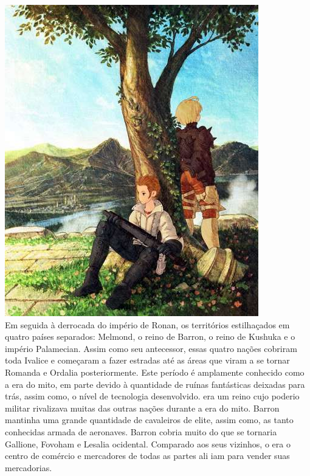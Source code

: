 %
\ofpar
\includegraphics[width=\columnwidth]{./art/worldbook/tree.jpg}
\ofrow
%
\\
Em seguida à derrocada do império de Ronan, os territórios estilhaçados em quatro países separados: Melmond, o reino de Barron, o reino de Kushuka e o império Palamecian.
Assim como seu antecessor, essas quatro nações cobriram toda Ivalice e começaram a fazer estradas até as áreas que viram a se tornar Romanda e Ordalia posteriormente.
Este período é amplamente conhecido como a era do mito, em parte devido à quantidade de ruínas fantásticas deixadas para trás, assim como, o nível de tecnologia desenvolvido.
  era um reino cujo poderio militar rivalizava muitas das outras nações durante a era do mito.
Barron mantinha uma grande quantidade de cavaleiros de elite, assim como, as tanto conhecidas armada de aeronaves.
Barron cobria muito do que se tornaria Gallione, Fovoham e Lesalia ocidental.
Comparado aos seus vizinhos, o  era o centro de comércio e mercadores de todas as partes ali iam para vender suas mercadorias.
